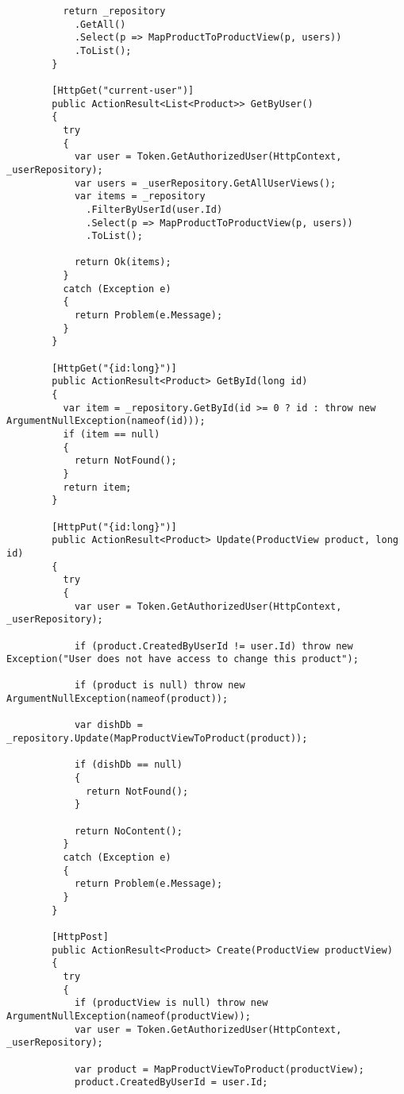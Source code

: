 \begin{lstlisting}
          return _repository
            .GetAll()
            .Select(p => MapProductToProductView(p, users))
            .ToList();
        }
        
        [HttpGet("current-user")]
        public ActionResult<List<Product>> GetByUser()
        {
          try
          {
            var user = Token.GetAuthorizedUser(HttpContext, _userRepository);
            var users = _userRepository.GetAllUserViews();
            var items = _repository
              .FilterByUserId(user.Id)
              .Select(p => MapProductToProductView(p, users))
              .ToList();
            
            return Ok(items);
          }
          catch (Exception e)
          {
            return Problem(e.Message);
          }
        }
    
        [HttpGet("{id:long}")]
        public ActionResult<Product> GetById(long id)
        {
          var item = _repository.GetById(id >= 0 ? id : throw new ArgumentNullException(nameof(id)));
          if (item == null)
          {
            return NotFound();
          }
          return item;
        }
    
        [HttpPut("{id:long}")]
        public ActionResult<Product> Update(ProductView product, long id)
        {
          try
          {
            var user = Token.GetAuthorizedUser(HttpContext, _userRepository);
    
            if (product.CreatedByUserId != user.Id) throw new Exception("User does not have access to change this product");
            
            if (product is null) throw new ArgumentNullException(nameof(product));
            
            var dishDb = _repository.Update(MapProductViewToProduct(product));
            
            if (dishDb == null)
            {
              return NotFound();
            }
    
            return NoContent();
          }
          catch (Exception e)
          {
            return Problem(e.Message);
          }
        }
    
        [HttpPost]
        public ActionResult<Product> Create(ProductView productView)
        {
          try
          {
            if (productView is null) throw new ArgumentNullException(nameof(productView));
            var user = Token.GetAuthorizedUser(HttpContext, _userRepository);
    
            var product = MapProductViewToProduct(productView);
            product.CreatedByUserId = user.Id;
            

\end{lstlisting}
